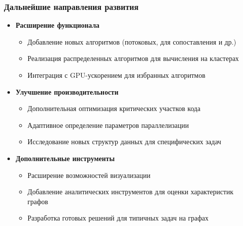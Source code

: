 \documentclass[aspectratio=169]{beamer}
\begin{document}
\begin{frame}
  \frametitle{Дальнейшие направления развития}
  \begin{itemize}
    \item \textbf{Расширение функционала}
      \begin{itemize}
        \item Добавление новых алгоритмов (потоковых, для сопоставления и др.)
        \item Реализация распределенных алгоритмов для вычисления на кластерах
        \item Интеграция с GPU-ускорением для избранных алгоритмов
      \end{itemize}
    \item \textbf{Улучшение производительности}
      \begin{itemize}
        \item Дополнительная оптимизация критических участков кода
        \item Адаптивное определение параметров параллелизации
        \item Исследование новых структур данных для специфических задач
      \end{itemize}
    \item \textbf{Дополнительные инструменты}
      \begin{itemize}
        \item Расширение возможностей визуализации
        \item Добавление аналитических инструментов для оценки характеристик графов
        \item Разработка готовых решений для типичных задач на графах
      \end{itemize}
  \end{itemize}
\end{frame}

\end{document}
